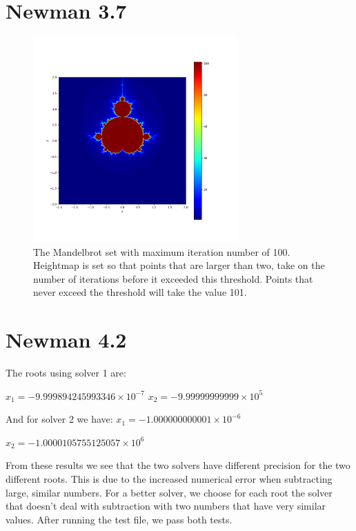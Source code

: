 \documentclass[11pt]{article}
\begin{document}
\section{Newman 3.7}
\begin{figure}[h!]
    \centering
    \includegraphics[width=0.7\textwidth]{fractal.png}
    \caption{The Mandelbrot set with maximum iteration number of 100. Heightmap is set so that points that are larger than two, take on the number of iterations before it exceeded this threshold. Points that never exceed the threshold will take the value 101. }
    \label{fig:your_label}
\end{figure}

\section{Newman 4.2}
The roots using solver 1 are: 

$x_1=-9.999894245993346 \times 10^{-7}$
$x_2=-9.99999999999 \times 10^{5}$

And for solver 2 we have: 
$x_1=-1.000000000001 \times 10^{-6}$

$x_2=-1.0000105755125057\times10^{6}$


From these results we see that the two solvers have different precision for the two different roots. This is due to the increased numerical error when subtracting large, similar numbers. For a better solver, we choose for each root the solver that doesn't deal with subtraction with two numbers that have very similar values. After running the test file, we pass both tests.
\end{document}
